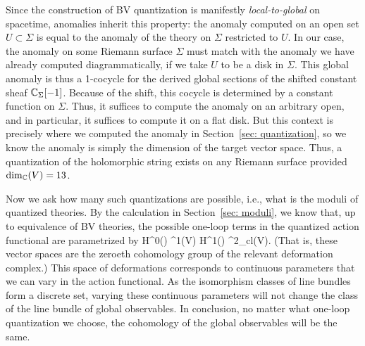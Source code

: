 Since the construction of BV quantization is manifestly {\em local-to-global} on spacetime, 
anomalies inherit this property: 
the anomaly computed on an open set $U \subset \Sigma$ is equal to the anomaly of the theory on $\Sigma$ restricted to $U$. 
In our case, the anomaly on some Riemann surface $\Sigma$ must match with the anomaly we have already computed diagrammatically, if we take $U$ to be a disk in $\Sigma$.
This global anomaly is thus a 1-cocycle for the derived global sections of the shifted constant sheaf $\mathbb C_\Sigma[-1]$.
Because of the shift, this cocycle is determined by a constant function on $\Sigma$.
Thus, it suffices to compute the anomaly on an arbitrary open,
and in particular, it suffices to compute it on a flat disk. 
But this context is precisely where we computed the anomaly in Section~\ref{sec: quantization}, 
so we know the anomaly is simply the dimension of the target vector space.
Thus, a quantization of the holomorphic string exists on any Riemann surface provided $\dim_{\mathbb C}(V) = 13$. 

Now we ask how many such quantizations are possible,
i.e., what is the moduli of quantized theories.
By the calculation in Section~\ref{sec: moduli}, 
we know that, up to equivalence of BV theories, 
the possible one-loop terms in the quantized action functional are parametrized by
\ben
H^0(\Sigma) \tensor \Omega^1(V) \oplus H^1(\Sigma) \tensor \Omega^2_{cl}(V).
\een 
(That is, these vector spaces are the zeroeth cohomology group of the relevant deformation complex.)
This space of deformations corresponds to continuous parameters that we can vary in the action functional.
As the isomorphism classes of line bundles form a discrete set, 
varying these continuous parameters will not change the class of the line bundle of global observables. 
In conclusion, no matter what one-loop quantization we choose, 
the cohomology of the global observables will be the same.

